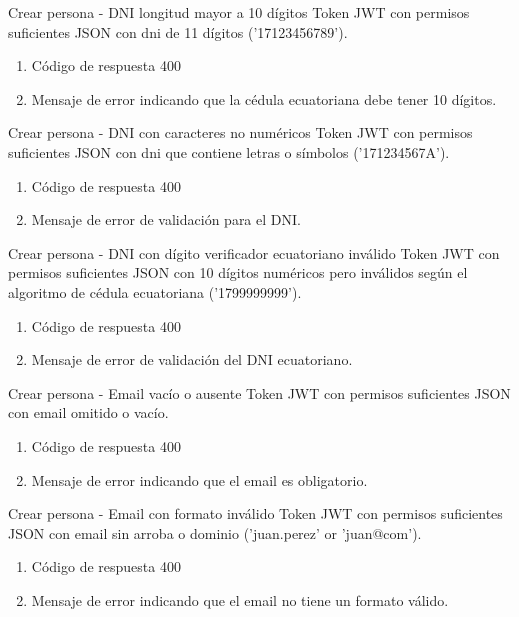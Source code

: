 {Crear persona - DNI longitud mayor a 10 dígitos}
{Token JWT con permisos suficientes}
{JSON con dni de 11 dígitos ('17123456789').}
{\begin{enumerate} [leftmargin=*, nosep]
    \item Código de respuesta 400
    \item Mensaje de error indicando que la cédula ecuatoriana debe tener 10 dígitos.
\end{enumerate}}

{Crear persona - DNI con caracteres no numéricos}
{Token JWT con permisos suficientes}
{JSON con dni que contiene letras o símbolos ('171234567A').}
{\begin{enumerate} [leftmargin=*, nosep]
    \item Código de respuesta 400
    \item Mensaje de error de validación para el DNI.
\end{enumerate}}

{Crear persona - DNI con dígito verificador ecuatoriano inválido}
{Token JWT con permisos suficientes}
{JSON con 10 dígitos numéricos pero inválidos según el algoritmo de cédula ecuatoriana ('1799999999').}
{\begin{enumerate} [leftmargin=*, nosep]
    \item Código de respuesta 400
    \item Mensaje de error de validación del DNI ecuatoriano.
\end{enumerate}}

{Crear persona - Email vacío o ausente}
{Token JWT con permisos suficientes}
{JSON con email omitido o vacío.}
{\begin{enumerate} [leftmargin=*, nosep]
    \item Código de respuesta 400
    \item Mensaje de error indicando que el email es obligatorio.
\end{enumerate}}

{Crear persona - Email con formato inválido}
{Token JWT con permisos suficientes}
{JSON con email sin arroba o dominio ('juan.perez' or 'juan@com').}
{\begin{enumerate} [leftmargin=*, nosep]
    \item Código de respuesta 400
    \item Mensaje de error indicando que el email no tiene un formato válido.
\end{enumerate}}

